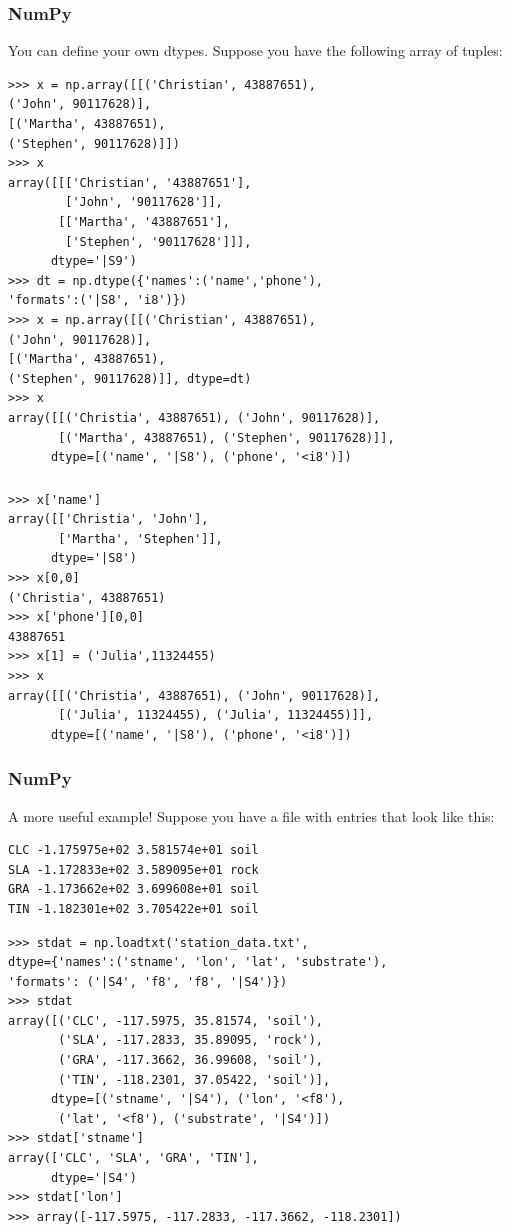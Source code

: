 \begin{frame}[fragile]
\frametitle{NumPy}
You can define your own dtypes. Suppose you have the following array of tuples:
\begin{myColorBox}{1.0}{}
\begin{verbatim}
>>> x = np.array([[('Christian', 43887651), 
('John', 90117628)],
[('Martha', 43887651), 
('Stephen', 90117628)]])
>>> x
array([[['Christian', '43887651'],
        ['John', '90117628']],
       [['Martha', '43887651'],
        ['Stephen', '90117628']]], 
      dtype='|S9')
>>> dt = np.dtype({'names':('name','phone'),
'formats':('|S8', 'i8')})
>>> x = np.array([[('Christian', 43887651), 
('John', 90117628)],
[('Martha', 43887651), 
('Stephen', 90117628)]], dtype=dt)
>>> x
array([[('Christia', 43887651), ('John', 90117628)],
       [('Martha', 43887651), ('Stephen', 90117628)]], 
      dtype=[('name', '|S8'), ('phone', '<i8')])
\end{verbatim}
\end{myColorBox}
\end{frame}

\begin{frame}[fragile]
\frametitle{}
\begin{myColorBox}{1.0}{}
\begin{verbatim}
>>> x['name']
array([['Christia', 'John'],
       ['Martha', 'Stephen']], 
      dtype='|S8')
>>> x[0,0]
('Christia', 43887651)
>>> x['phone'][0,0]
43887651
>>> x[1] = ('Julia',11324455)
>>> x
array([[('Christia', 43887651), ('John', 90117628)],
       [('Julia', 11324455), ('Julia', 11324455)]], 
      dtype=[('name', '|S8'), ('phone', '<i8')])
\end{verbatim}
\end{myColorBox}
\end{frame}

\begin{frame}[fragile]
    \frametitle{NumPy}
A more useful example! Suppose you have a file with entries that look like
this:
\begin{verbatim}
CLC -1.175975e+02 3.581574e+01 soil
SLA -1.172833e+02 3.589095e+01 rock
GRA -1.173662e+02 3.699608e+01 soil
TIN -1.182301e+02 3.705422e+01 soil
\end{verbatim}
    \pause    
    \begin{myColorBox}{1.0}{}
\begin{verbatim}
>>> stdat = np.loadtxt('station_data.txt',
dtype={'names':('stname', 'lon', 'lat', 'substrate'),
'formats': ('|S4', 'f8', 'f8', '|S4')})
>>> stdat
array([('CLC', -117.5975, 35.81574, 'soil'),
       ('SLA', -117.2833, 35.89095, 'rock'),
       ('GRA', -117.3662, 36.99608, 'soil'),
       ('TIN', -118.2301, 37.05422, 'soil')], 
      dtype=[('stname', '|S4'), ('lon', '<f8'),
       ('lat', '<f8'), ('substrate', '|S4')])
>>> stdat['stname']
array(['CLC', 'SLA', 'GRA', 'TIN'], 
      dtype='|S4')
>>> stdat['lon']
>>> array([-117.5975, -117.2833, -117.3662, -118.2301])
\end{verbatim}
    \end{myColorBox}
\end{frame}



